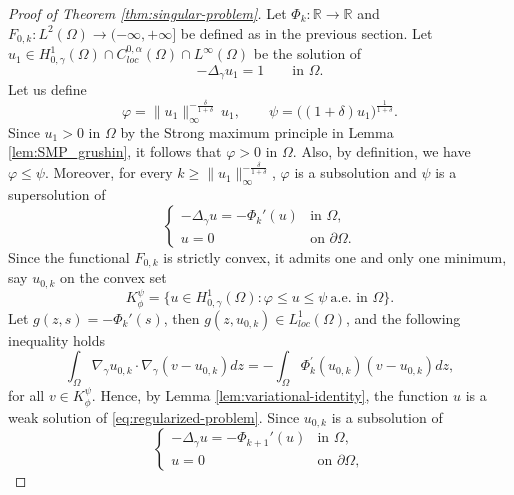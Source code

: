 \documentclass[11pt]{article}
\newcommand{\om} {\Omega}
\newcommand{\gradgr}{\nabla_{\gamma}}
\newcommand{\spacegr}{H^{1}_{0,\gamma}(\Omega)}
\begin{document}
\begin{proof}[Proof of Theorem \ref{thm:singular-problem}]
Let $\Phi_k : \mathbb{R} \to \mathbb{R}$ and $F_{0,k} : L^2(\Omega) \to (-\infty,+\infty]$ be defined as in the previous section. Let $u_1 \in \spacegr \cap C^{0,\alpha}_{loc}(\Omega) \cap L^{\infty}(\om)$ be the solution of
\begin{equation*}
-\Delta_{\gamma} u_1 = 1
\qquad \text{in } \Omega .
\end{equation*}
Let us define
\begin{equation*}
\varphi
=
\|u_1\|_\infty^{-\frac{\delta}{1+\delta}}\, u_1,
\qquad
\psi
=
\bigl( (1+\delta) u_1 \bigr)^{\frac{1}{1+\delta}} .
\end{equation*}
Since $u_1 > 0$ in $\Omega$ by the Strong maximum principle in Lemma \ref{lem:SMP_grushin}, it follows that $\varphi > 0$ in $\om$. Also, by definition, we have $\varphi \le \psi$. Moreover, for every $k \ge \|u_1\|_\infty^{-\frac{\delta}{1+\delta}}$, $\varphi$ is a subsolution and $\psi$ is a supersolution of 
\begin{equation}
\label{eq:regularized-problem}
\begin{cases}
-\Delta_{\gamma} u = -\Phi_k'(u) & \text{in } \Omega, \\
u = 0 & \text{on } \partial\Omega .
\end{cases}
\end{equation}
Since the functional $F_{0,k}$ is strictly convex, it admits one and only one minimum, say $u_{0,k}$ on the convex set
\begin{equation*}
K_{\phi}^{\psi} =
\bigl\{
u \in \spacegr
:
\varphi \le u \le \psi \ \text{a.e.\ in } \Omega
\bigr\}.
\end{equation*}
Let $g(z,s) = -\Phi_k'(s)$, then $g(z,u_{0,k}) \in L^1_{loc}(\Omega)$, and the following inequality holds 
\begin{equation*}
 \int_{\om} \gradgr u_{0,k} \cdot \gradgr (v - u_{0,k}) dz = - \int_{\om} \Phi_k^{'} (u_{0,k}) (v - u_{0,k}) dz,   
\end{equation*}
for all $v \in K_{\phi}^{\psi}$. Hence, by Lemma \ref{lem:variational-identity}, the function $u$ is a weak solution of \eqref{eq:regularized-problem}. Since $u_{0,k}$ is a subsolution of
\begin{equation*}
\begin{cases}
-\Delta_{\gamma} u = -\Phi_{k+1}'(u) & \text{in } \Omega, \\
u = 0 & \text{on } \partial\Omega,
\end{cases}
\end{equation*}

\end{proof}
\end{document}
